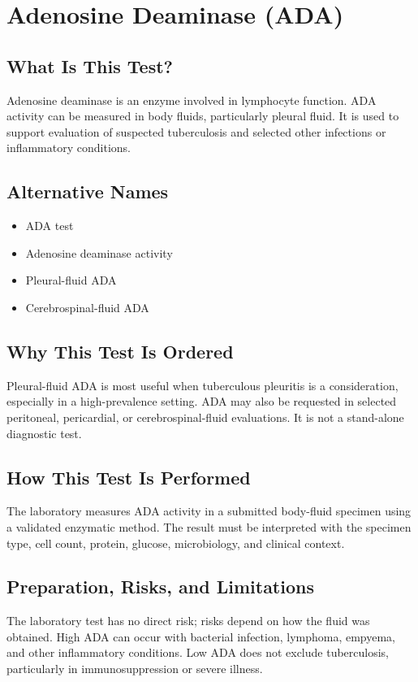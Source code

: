 \chapter{Adenosine Deaminase (ADA)}

\section*{What Is This Test?}
Adenosine deaminase is an enzyme involved in lymphocyte function. ADA activity can be measured in body fluids, particularly pleural fluid. It is used to support evaluation of suspected tuberculosis and selected other infections or inflammatory conditions.

\section*{Alternative Names}
\begin{itemize}
  \item ADA test
  \item Adenosine deaminase activity
  \item Pleural-fluid ADA
  \item Cerebrospinal-fluid ADA
\end{itemize}

\section*{Why This Test Is Ordered}
Pleural-fluid ADA is most useful when tuberculous pleuritis is a consideration, especially in a high-prevalence setting. ADA may also be requested in selected peritoneal, pericardial, or cerebrospinal-fluid evaluations. It is not a stand-alone diagnostic test.

\section*{How This Test Is Performed}
The laboratory measures ADA activity in a submitted body-fluid specimen using a validated enzymatic method. The result must be interpreted with the specimen type, cell count, protein, glucose, microbiology, and clinical context.

\section*{Preparation, Risks, and Limitations}
The laboratory test has no direct risk; risks depend on how the fluid was obtained. High ADA can occur with bacterial infection, lymphoma, empyema, and other inflammatory conditions. Low ADA does not exclude tuberculosis, particularly in immunosuppression or severe illness.

